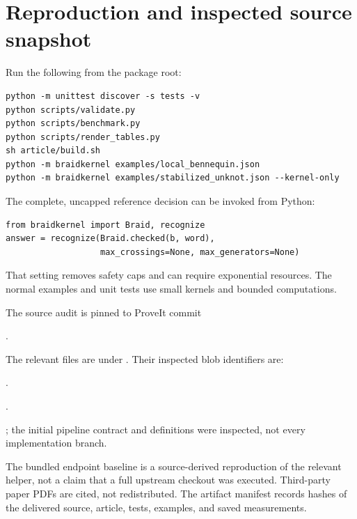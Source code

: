 \documentclass[11pt,letterpaper]{article}
\theoremstyle{definition}
\begin{document}
\section{Reproduction and inspected source snapshot}
Run the following from the package root:
\begin{verbatim}
python -m unittest discover -s tests -v
python scripts/validate.py
python scripts/benchmark.py
python scripts/render_tables.py
sh article/build.sh
python -m braidkernel examples/local_bennequin.json
python -m braidkernel examples/stabilized_unknot.json --kernel-only
\end{verbatim}
The complete, uncapped reference decision can be invoked from Python:
\begin{verbatim}
from braidkernel import Braid, recognize
answer = recognize(Braid.checked(b, word),
                   max_crossings=None, max_generators=None)
\end{verbatim}
That setting removes safety caps and can require exponential resources. The normal examples and unit tests use small kernels and bounded computations.

The source audit is pinned to ProveIt commit
\begin{center}\small{}.\end{center}
The relevant files are under . Their inspected blob identifiers are:
\begin{description}[font=\normalfont\ttfamily,style=nextline]
\item[braid\_reduction.py] .
\item[braid.py] .
\item[recognize.py] ; the initial pipeline contract and definitions were inspected, not every implementation branch.
\end{description}
The bundled endpoint baseline is a source-derived reproduction of the relevant helper, not a claim that a full upstream checkout was executed. Third-party paper PDFs are cited, not redistributed. The artifact manifest records hashes of the delivered source, article, tests, examples, and saved measurements.
\end{document}
